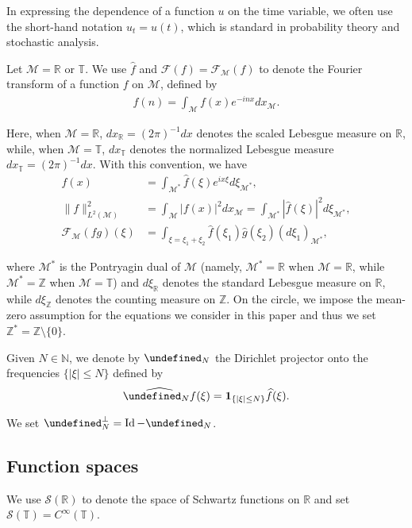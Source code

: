\documentclass[letterpaper, 11pt,  reqno]{amsart}
\DeclareMathOperator*{\intt}{\int}
\DeclareMathOperator{\Id}{Id}
\newcommand{\1}{\hspace{0.5mm}\text{I}\hspace{0.5mm}}
\newcommand{\noi}{\noindent}
\newcommand{\Z}{\mathbb{Z}}
\newcommand{\R}{\mathbb{R}}
\newcommand{\T}{\mathbb{T}}
\let\P= \undefined
\newcommand{\P}{\mathbf{P}}
\newcommand{\F}{\mathcal{F}}
\newcommand{\ft}{\widehat}
\newcommand{\ind}{\mathbf 1}
\renewcommand{\S}{\mathcal{S}}
\newcommand{\M}{\mathcal{M}}
\newcommand{\N}{\mathbb{N}}
\numberwithin{equation}{section}
\numberwithin{theorem}{section}
\begin{document}
In expressing the dependence of a function $u$
on the time variable, we often use the short-hand notation
$u_t = u(t)$,  which is standard in probability theory and stochastic analysis.




Let $\M = \R$ or $\T$.
We  use $\ft f$ and $\F(f) = \F_\M(f)$
to denote
the  Fourier transform
of a function $f$ on $\M$, 
defined by 
\begin{align*}
\ft  f(n)=\int_{\M}f(x)e^{-i n x} d x_\M.
\end{align*}

\noi
Here, when $\M= \R$, $dx_\R =(2\pi)^{-1} dx$ denotes
the scaled Lebesgue measure on $\R$, 
while, when $\M = \T$, 
$dx_\T$ denotes
 the normalized Lebesgue measure $ dx_\T =  (2\pi)^{-1}dx$.
 With this convention, we have 
\begin{align*}
f(x)
& = \int_{\M^*} \ft f( \xi) e^{ix \xi} d\xi_{\M^*}, \\
\| f\|_{L^2(\M)}^2 
& = \int_{\M}|f(x)|^2 d x_\M
= \int_{\M^*} |\ft f( \xi)|^2 d\xi_{\M^*}, \\
\F_\M(fg)(\xi)
& =
\intt_{\xi = \xi_1 + \xi_2}
 \ft  f(\xi_1)\ft  g(\xi_2) (d\xi_1)_{\M^*}, 
\end{align*}

\noi
where $\M^*$
is the Pontryagin dual of $\M$
(namely, $\M^*=\R$ when $\M = \R$, while  $\M^* = \Z$ when $\M = \T$)
and $d\xi_\R$
 denotes the standard  Lebesgue measure on $\R$, 
while $d\xi_{\Z}$ denotes the counting measure on $\Z$.
On the circle, we impose the mean-zero assumption
for the equations we consider in this paper
and thus we set  $\Z^* = \Z \setminus \{0\}$.



Given $N \in \N$, 
we denote by  $\P_N$
 the Dirichlet projector onto the frequencies 
$\{|\xi| \leq N\}$
defined by 
\begin{align}
 \ft{\P_N f}(\xi)= \ind_{\{|\xi|\leq N\}} \ft f(\xi).
 \label{Diri1}
\end{align}

\noi
We set $\P_N^\perp = \Id - \P_N$.





\subsection{Function spaces}






We use 
$\S(\R)$ to denote the space of Schwartz functions on $\R$
and set
$\S(\T) = C^\infty(\T)$.
\end{document}
